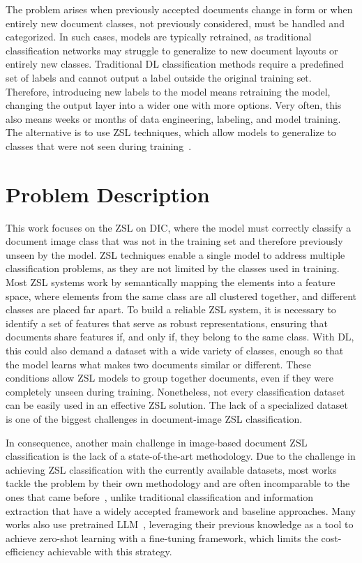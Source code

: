 The problem arises when previously accepted documents change in form or when entirely new document classes, not previously considered, must be handled and categorized. In such cases, models are typically retrained, as traditional classification networks may struggle to generalize to new document layouts or entirely new classes. Traditional \gls{DL} classification methods require a predefined set of labels and cannot output a label outside the original training set. Therefore, introducing new labels to the model means retraining the model, changing the output layer into a wider one with more options. Very often, this also means weeks or months of data engineering, labeling, and model training. The alternative is to use \gls{ZSL} techniques, which allow models to generalize to classes that were not seen during training~\cite{xian_zero-shot_2019}.


\section{Problem Description}
\label{sec:problem}

This work focuses on the \gls{ZSL} on \gls{DIC}, where the model must correctly classify a document image class that was not in the training set and therefore previously unseen by the model. \gls{ZSL} techniques enable a single model to address multiple classification problems, as they are not limited by the classes used in training. Most \gls{ZSL} systems work by semantically mapping the elements into a feature space, where elements from the same class are all clustered together, and different classes are placed far apart. To build a reliable \gls{ZSL} system, it is necessary to identify a set of features that serve as robust representations, ensuring that documents share features if, and only if, they belong to the same class. With \gls{DL}, this could also demand a dataset with a wide variety of classes, enough so that the model learns what makes two documents similar or different. These conditions allow \gls{ZSL} models to group together documents, even if they were completely unseen during training. Nonetheless, not every classification dataset can be easily used in an effective \gls{ZSL} solution. The lack of a specialized dataset is one of the biggest challenges in document-image \gls{ZSL} classification.

In consequence, another main challenge in image-based document \gls{ZSL} classification is the lack of a state-of-the-art methodology. Due to the challenge in achieving \gls{ZSL} classification with the currently available datasets, most works tackle the problem by their own methodology and are often incomparable to the ones that came before~\cite{sinha2024cica}, unlike traditional classification and information extraction that have a widely accepted framework and baseline approaches. Many works also use pretrained \gls{LLM}~\cite{scius2024zeroshot}, leveraging their previous knowledge as a tool to achieve zero-shot learning with a fine-tuning framework, which limits the cost-efficiency achievable with this strategy.

